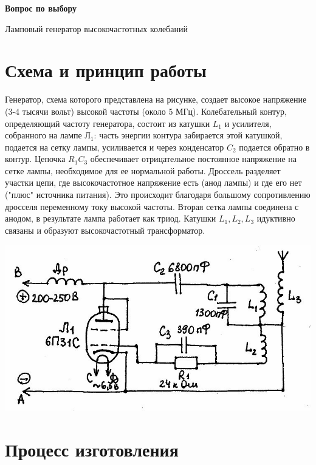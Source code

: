 \documentclass[a4paper,12pt]{article} %
\begin{document}
	
	\begin{center}
		{\huge \bf{Вопрос по выбору}}
	\end{center}
	\begin{center}
		{\huge Ламповый генератор высокочастотных колебаний}
	\end{center}

\section{Схема и принцип работы}

\noindent Генератор, схема которого представлена на рисунке, создает высокое напряжение (3-4 тысячи вольт) высокой частоты (около 5 МГц). Колебательный контур, определяющий частоту генератора, состоит из катушки $L_1$ и усилителя, собранного на лампе Л$_1$: часть энергии контура забирается этой катушкой, подается на сетку лампы, усиливается и через конденсатор $C_2$ подается обратно в контур. Цепочка $R_1 C_3$ обеспечивает отрицательное постоянное напряжение на сетке лампы, необходимое для ее нормальной работы. Дроссель разделяет участки цепи, где высокочастотное напряжение есть (анод лампы) и где его нет ("плюс" источника питания). Это происходит благодаря большому сопротивлению дросселя переменному току высокой частоты. Вторая сетка лампы соединена с анодом, в результате лампа работает как триод. Катушки $L_1, L_2, L_3$ идуктивно связаны и образуют высокочастотный трансформатор.

\medskip
\begin{center}

  \centering
  \includegraphics[scale={0.4}]{схема.jpg}

\end{center}

\noindent 

\section{Процесс изготовления}
\end{document}
